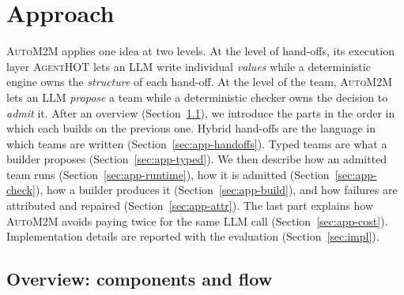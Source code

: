 \documentclass[pdflatex,sn-mathphys-num]{sn-jnl}
\theoremstyle{thmstyleone}%
\theoremstyle{thmstyletwo}%
\theoremstyle{thmstylethree}%
\newcommand{\tool}{\textsc{AgentHOT}}
\newcommand{\auto}{\textsc{AutoM2M}}
\begin{document}
\section{Approach}\label{sec:approach}

\auto{} applies one idea at two levels. At the level of hand-offs, its
execution layer \tool{} lets an LLM write individual \emph{values} while a
deterministic engine owns the \emph{structure} of each hand-off. At the level of
the team, \auto{} lets an LLM \emph{propose} a team while a deterministic
checker owns the decision to \emph{admit} it. After an overview
(Section~\ref{sec:app-overview}), we introduce the parts in the order in which
each builds on the previous one. Hybrid hand-offs are the language in which
teams are written (Section~\ref{sec:app-handoffs}). Typed teams are what a
builder proposes (Section~\ref{sec:app-typed}). We then describe how an admitted
team runs (Section~\ref{sec:app-runtime}), how it is admitted
(Section~\ref{sec:app-check}), how a builder produces it
(Section~\ref{sec:app-build}), and how failures are attributed and repaired
(Section~\ref{sec:app-attr}). The last part explains how \auto{} avoids paying
twice for the same LLM call (Section~\ref{sec:app-cost}). Implementation
details are reported with the evaluation (Section~\ref{sec:impl}).

\subsection{Overview: components and flow}\label{sec:app-overview}
\end{document}
